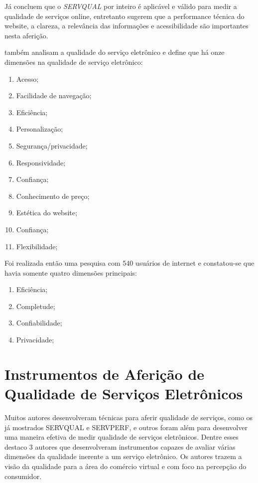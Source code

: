 Já \cite{chaffey2002} concluem que o \textit{SERVQUAL} por inteiro é aplicável e válido para medir a qualidade de serviços online, entretanto sugerem que a performance técnica do website, a clareza, a relevância das informações e acessibilidade são importantes nesta aferição. 

\cite{parasuraman2002} também analisam a qualidade do serviço eletrônico e define que há onze dimensões na qualidade de serviço eletrônico:
\begin{enumerate}
	\item Acesso;
	\item Facilidade de navegação;
	\item Eficiência;
	\item Personalização;
	\item Segurança/privacidade;
	\item Responsividade;
	\item Confiança;
	\item Conhecimento de preço;
	\item Estética do website;
	\item Confiança;
	\item Flexibilidade;
\end{enumerate}

Foi realizada então uma pesquisa com 540 usuários de internet e constatou-se que havia somente quatro dimensões principais:

\begin{enumerate}
	\item Eficiência;
	\item Completude;
	\item Confiabilidade;
	\item Privacidade;
\end{enumerate}

\section{Instrumentos de Aferição de Qualidade de Serviços Eletrônicos}

Muitos autores desenvolveram técnicas para aferir qualidade de serviços, como os já mostrados SERVQUAL e SERVPERF, e outros foram além para desenvolver uma maneira efetiva de medir qualidade de serviços eletrônicos. Dentre esses destaco 3 autores que desenvolveram instrumentos capazes de avaliar várias dimensões da qualidade inerente a um serviço eletrônico. Os autores trazem a visão da qualidade para a área do comércio virtual e com foco na percepção do consumidor.

